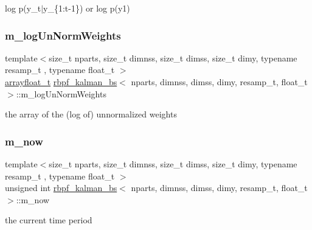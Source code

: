 log p(y\+\_\+t$\vert$y\+\_\+\{1\+:t-\/1\}) or log p(y1) \mbox{\label{classrbpf__kalman__bs_a2f61f3dca55d4c7f32b408569a75f464}} 
\subsubsection{\texorpdfstring{m\+\_\+log\+Un\+Norm\+Weights}{m\_logUnNormWeights}}
{\footnotesize\ttfamily template$<$size\+\_\+t nparts, size\+\_\+t dimnss, size\+\_\+t dimss, size\+\_\+t dimy, typename resamp\+\_\+t , typename float\+\_\+t $>$ \\
\hyperlink{classrbpf__kalman__bs_ae45e5522570234a1126f28fbe6a13c75}{arrayfloat\+\_\+t} \hyperlink{classrbpf__kalman__bs}{rbpf\+\_\+kalman\+\_\+bs}$<$ nparts, dimnss, dimss, dimy, resamp\+\_\+t, float\+\_\+t $>$\+::m\+\_\+log\+Un\+Norm\+Weights\hspace{0.3cm}{\ttfamily [private]}}

the array of the (log of) unnormalized weights \mbox{\label{classrbpf__kalman__bs_a84dfd5c00db5f3772430498585b776d6}} 
\subsubsection{\texorpdfstring{m\+\_\+now}{m\_now}}
{\footnotesize\ttfamily template$<$size\+\_\+t nparts, size\+\_\+t dimnss, size\+\_\+t dimss, size\+\_\+t dimy, typename resamp\+\_\+t , typename float\+\_\+t $>$ \\
unsigned int \hyperlink{classrbpf__kalman__bs}{rbpf\+\_\+kalman\+\_\+bs}$<$ nparts, dimnss, dimss, dimy, resamp\+\_\+t, float\+\_\+t $>$\+::m\+\_\+now\hspace{0.3cm}{\ttfamily [private]}}

the current time period \mbox{\label{classrbpf__kalman__bs_a15975ae1d3e70b7bac82f09139d07250}} 
